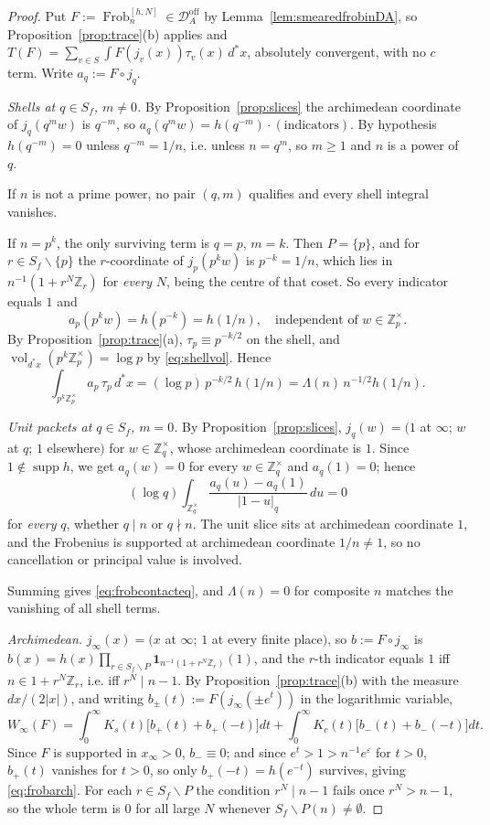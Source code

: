 \documentclass[11pt]{amsart}
\theoremstyle{definition}
\theoremstyle{remark}
\newcommand{\Z}{\mathbb Z}
\newcommand{\Frob}{\operatorname{Frob}}
\newcommand{\supp}{\operatorname{supp}}
\newcommand{\vol}{\operatorname{vol}}
\newcommand{\Doff}{\mathcal D_A^{\mathrm{off}}}
\begin{document}
\begin{proof}
Put $F:=\Frob_n^{[h,N]}\in\Doff$ by Lemma~\ref{lem:smearedfrobinDA}, so
Proposition~\ref{prop:trace}(b) applies and
$T(F)=\sum_{v\in S}\int F(j_v(x))\tau_v(x)\,d^*x$, absolutely convergent, with
no $c$ term. Write $a_q:=F\circ j_q$.

\emph{Shells at $q\in S_f$, $m\ne0$.} By Proposition~\ref{prop:slices} the
archimedean coordinate of $j_q(q^mw)$ is $q^{-m}$, so
$a_q(q^mw)=h(q^{-m})\cdot(\text{indicators})$. By hypothesis $h(q^{-m})=0$
unless $q^{-m}=1/n$, i.e. unless $n=q^m$, so $m\ge1$ and $n$ is a power of $q$.

If $n$ is not a prime power, no pair $(q,m)$ qualifies and every shell integral
vanishes.

If $n=p^k$, the only surviving term is $q=p$, $m=k$. Then $P=\{p\}$, and for
$r\in S_f\smallsetminus\{p\}$ the $r$-coordinate of $j_p(p^kw)$ is
$p^{-k}=1/n$, which lies in $n^{-1}(1+r^N\Z_r)$ for \emph{every} $N$, being the
centre of that coset. So every indicator equals $1$ and
\[
  a_p(p^kw)=h(p^{-k})=h(1/n),\quad\text{independent of }w\in\Z_p^\times .
\]
By Proposition~\ref{prop:trace}(a), $\tau_p\equiv p^{-k/2}$ on the shell, and
$\vol_{d^*x}(p^k\Z_p^\times)=\log p$ by \eqref{eq:shellvol}. Hence
\[
  \int_{p^k\Z_p^\times}a_p\,\tau_p\,d^*x=(\log p)\,p^{-k/2}\,h(1/n)
   =\Lambda(n)\,n^{-1/2}h(1/n).
\]

\emph{Unit packets at $q\in S_f$, $m=0$.} By Proposition~\ref{prop:slices},
$j_q(w)=(1$ at $\infty$; $w$ at $q$; $1$ elsewhere$)$ for $w\in\Z_q^\times$,
whose archimedean coordinate is $1$. Since $1\notin\supp h$, we get $a_q(w)=0$
for every $w\in\Z_q^\times$ and $a_q(1)=0$; hence
\[
  (\log q)\int_{\Z_q^\times}\frac{a_q(u)-a_q(1)}{|1-u|_q}\,du=0
\]
for \emph{every} $q$, whether $q\mid n$ or $q\nmid n$. The unit slice sits at
archimedean coordinate $1$, and the Frobenius is supported at archimedean
coordinate $1/n\ne1$, so no cancellation or principal value is involved.

Summing gives \eqref{eq:frobcontacteq}, and $\Lambda(n)=0$ for composite $n$
matches the vanishing of all shell terms.

\emph{Archimedean.} $j_\infty(x)=(x$ at $\infty$; $1$ at every finite place$)$,
so $b:=F\circ j_\infty$ is
$b(x)=h(x)\prod_{r\in S_f\smallsetminus P}\mathbf 1_{n^{-1}(1+r^N\Z_r)}(1)$, and
the $r$-th indicator equals $1$ iff $n\in1+r^N\Z_r$, i.e. iff $r^N\mid n-1$.
By Proposition~\ref{prop:trace}(b) with the measure $dx/(2|x|)$, and
writing $b_\pm(t):=F(j_\infty(\pm e^t))$ in the logarithmic variable,
\[
  W_\infty(F)=\int_0^\infty K_s(t)\bigl[b_+(t)+b_+(-t)\bigr]dt
   +\int_0^\infty K_c(t)\bigl[b_-(t)+b_-(-t)\bigr]dt .
\]
Since $F$ is supported in $x_\infty>0$, $b_-\equiv0$; and since
$e^t>1>n^{-1}e^\varepsilon$ for $t>0$, $b_+(t)$ vanishes for $t>0$, so only
$b_+(-t)=h(e^{-t})$ survives,
giving \eqref{eq:frobarch}. For each $r\in S_f\smallsetminus P$ the condition
$r^N\mid n-1$ fails once $r^N>n-1$, so the whole term is $0$ for all large $N$
whenever $S_f\smallsetminus P(n)\ne\emptyset$.
\end{proof}
\end{document}
